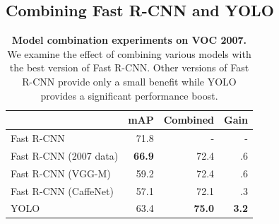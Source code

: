 \documentclass[10pt,twocolumn,letterpaper]{article}
\begin{document}


\subsection{Combining Fast R-CNN and YOLO}

\begin{table}[b]
\begin{center}
\begin{tabular}{lrrr}
 & mAP & Combined & Gain \\
\hline
Fast R-CNN & 71.8 & - & - \\
\hline
Fast R-CNN (2007 data) & \textbf{66.9} & 72.4 & .6  \\
Fast R-CNN (VGG-M) & 59.2 & 72.4 & .6 \\
Fast R-CNN (CaffeNet) & 57.1  & 72.1 & .3\\
YOLO & 63.4  & \textbf{75.0} & \textbf{3.2}\\
\end{tabular}
\end{center}
\caption{\small \textbf{Model combination experiments on VOC 2007.} We examine the effect of combining various models with the best version of Fast R-CNN. Other versions of Fast R-CNN provide only a small benefit while YOLO provides a significant performance boost.}
\label{combine}
\end{table}
\end{document}
